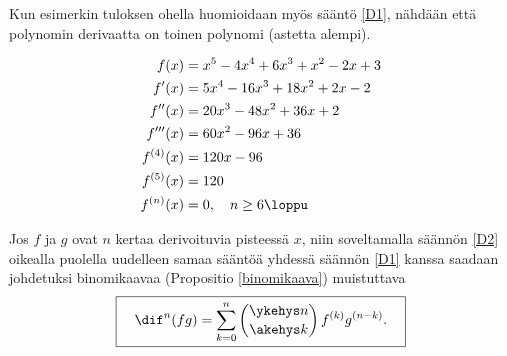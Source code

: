 Kun esimerkin tuloksen ohella huomioidaan myös sääntö \eqref{D1}, nähdään että polynomin
derivaatta on toinen polynomi (astetta alempi).
\begin{Exa}
\begin{align*}
f(x)       &=x^5-4x^4+6x^3+x^2-2x+3 \\
f'(x)      &=5x^4-16x^3+18x^2+2x-2 \\
f''(x)     &=20x^3-48x^2+36x+2 \\
f'''(x)    &=60x^2-96x+36 \\
f^{(4)}(x) &=120x-96 \\
f^{(5)}(x) &=120 \\
f^{(n)}(x) &=0, \quad n\geq 6 \loppu
\end{align*}
\end{Exa}

Jos $f$ ja $g$ ovat $n$ kertaa derivoituvia pisteessä $x$, niin soveltamalla säännön
\eqref{D2} oikealla puolella uudelleen samaa sääntöä yhdessä säännön \eqref{D1} kanssa
saadaan johdetuksi binomikaavaa (Propositio \ref{binomikaava}) muistuttava
 
\[
\boxed{\quad \dif^n(fg) = \sum_{k=0}^n \binom{\ykehys n}{\akehys k}\,f^{(k)}g^{(n-k)}. \quad}
\]

